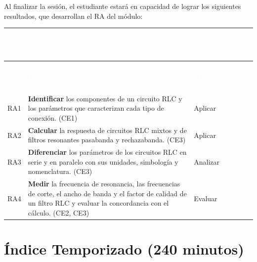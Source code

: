 \documentclass[11pt,letterpaper]{article}
\begin{document}
Al finalizar la sesión, el estudiante estará en capacidad de lograr los siguientes resultados, que desarrollan el RA del módulo:

\begin{xltabular}{\linewidth}{>{\raggedright\arraybackslash}p{1.1cm}>{\raggedright\arraybackslash}X>{\raggedright\arraybackslash}p{3.9cm}}
 \textcolor{white}{\textbf{\#}} & \textcolor{white}{\textbf{Resultado de aprendizaje}} & \textcolor{white}{\textbf{Nivel (Taxonomía de Bloom)}} \\
\endfirsthead
{} \textcolor{white}{\textbf{\#}} & \textcolor{white}{\textbf{Resultado de aprendizaje}} & \textcolor{white}{\textbf{Nivel (Taxonomía de Bloom)}} \\
\endhead
\bottomrule
\endlastfoot
  RA1 & \textbf{Identificar} los componentes de un circuito RLC y los parámetros que caracterizan cada tipo de conexión. (CE1) & Aplicar \\
   RA2 & \textbf{Calcular} la respuesta de circuitos RLC mixtos y de filtros resonantes pasabanda y rechazabanda. (CE3) & Aplicar \\
  RA3 & \textbf{Diferenciar} los parámetros de los circuitos RLC en serie y en paralelo con sus unidades, simbología y nomenclatura. (CE3) & Analizar \\
   RA4 & \textbf{Medir} la frecuencia de resonancia, las frecuencias de corte, el ancho de banda y el factor de calidad de un filtro RLC y evaluar la concordancia con el cálculo. (CE2, CE3) & Evaluar \\
\end{xltabular}

\section{Índice Temporizado (240 minutos)}
\end{document}
